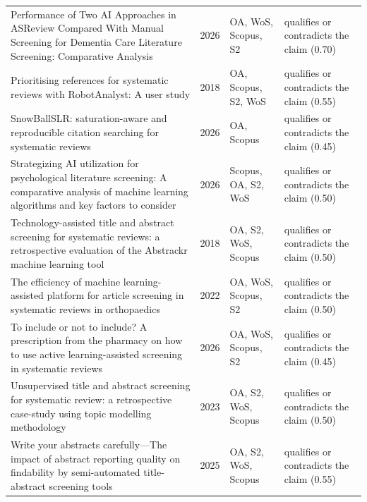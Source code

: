 \begin{longtable}{@{}%
  >{\raggedright\arraybackslash}p{}c%
  >{\raggedright\arraybackslash}p{}%
  >{\raggedright\arraybackslash}p{}@{}}
Performance of Two AI Approaches in ASReview Compared With Manual Screening for Dementia Care Literature Screening: Comparative Analysis & 2026 & OA, WoS, Scopus, S2 & qualifies or contradicts the claim (0.70) \\
Prioritising references for systematic reviews with RobotAnalyst: A user study & 2018 & OA, Scopus, S2, WoS & qualifies or contradicts the claim (0.55) \\
SnowBallSLR: saturation-aware and reproducible citation searching for systematic reviews & 2026 & OA, Scopus & qualifies or contradicts the claim (0.45) \\
Strategizing AI utilization for psychological literature screening: A comparative analysis of machine learning algorithms and key factors to consider & 2026 & Scopus, OA, S2, WoS & qualifies or contradicts the claim (0.50) \\
Technology-assisted title and abstract screening for systematic reviews: a retrospective evaluation of the Abstrackr machine learning tool & 2018 & OA, S2, WoS, Scopus & qualifies or contradicts the claim (0.50) \\
The efficiency of machine learning-assisted platform for article screening in systematic reviews in orthopaedics & 2022 & OA, WoS, Scopus, S2 & qualifies or contradicts the claim (0.50) \\
To include or not to include? A prescription from the pharmacy on how to use active learning-assisted screening in systematic reviews & 2026 & OA, WoS, Scopus, S2 & qualifies or contradicts the claim (0.45) \\
Unsupervised title and abstract screening for systematic review: a retrospective case-study using topic modelling methodology & 2023 & OA, S2, WoS, Scopus & qualifies or contradicts the claim (0.50) \\
Write your abstracts carefully---The impact of abstract reporting quality on findability by semi-automated title-abstract screening tools & 2025 & OA, S2, WoS, Scopus & qualifies or contradicts the claim (0.55) \\
\end{longtable}
\endgroup
